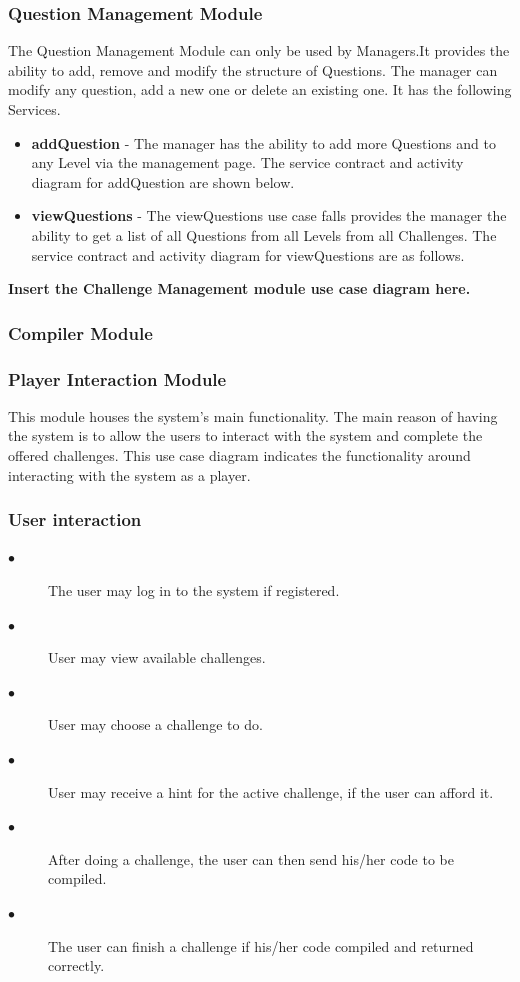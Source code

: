 \documentclass[english]{article}
\begin{document}
		\subsubsection{Question Management Module}
		The Question Management Module can only be used by Managers.It provides the ability to add, remove and modify the structure of Questions. The manager can modify any question, add a new one or delete an existing one. It has the following Services.
		
		\begin{itemize}
	  		\item \textbf{addQuestion} -  The manager has the ability to add more Questions and to any Level via the management page. The service contract and activity diagram for addQuestion are shown below.
	  		
			\item \textbf{viewQuestions} - The viewQuestions use case falls provides the manager the ability to get a list of all Questions from all Levels from all Challenges. The service contract and activity diagram for viewQuestions are as follows.
			
	
		\end{itemize}
		
\textbf{Insert the Challenge Management module use case diagram here.} \newline
		\subsubsection{Compiler Module}
		\subsubsection{Player Interaction Module}
		This module houses the system's main functionality. The main reason of having the system is to allow the users to interact with the system and complete the offered challenges. This use case diagram indicates the functionality around interacting with the system as a player.
		
	\iffalse	
		\subsubsection{User interaction}
		\begin{description}
			\item[$\bullet$] The user may log in to the system if registered.
			\item[$\bullet$] User may view available challenges.
			\item[$\bullet$] User may choose a challenge to do.
			\item[$\bullet$] User may receive a hint for the active challenge, if the user can afford it.
			\item[$\bullet$] After doing a challenge, the user can then send his/her code to be compiled.
			\item[$\bullet$] The user can finish a challenge if his/her code compiled and returned correctly.
		\end{description}
		
\end{document}
